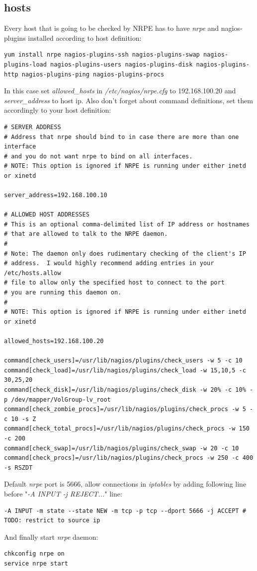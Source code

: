 \documentclass[10pt,a4paper,final]{report}
\begin{document}
\subsection{hosts}
Every host that is going to be checked by NRPE has to have \emph{nrpe} and nagios-plugins installed according to host definition:
\begin{lstlisting}
yum install nrpe nagios-plugins-ssh nagios-plugins-swap nagios-plugins-load nagios-plugins-users nagios-plugins-disk nagios-plugins-http nagios-plugins-ping nagios-plugins-procs
\end{lstlisting}
In this case set \emph{allowed\_hosts} in \emph{/etc/nagios/nrpe.cfg} to 192.168.100.20 and \emph{server\_address} to host ip. Also don't forget about command definitions, set them accordingly to your host definition:
\begin{lstlisting}
# SERVER ADDRESS
# Address that nrpe should bind to in case there are more than one interface
# and you do not want nrpe to bind on all interfaces.
# NOTE: This option is ignored if NRPE is running under either inetd or xinetd

server_address=192.168.100.10

# ALLOWED HOST ADDRESSES
# This is an optional comma-delimited list of IP address or hostnames 
# that are allowed to talk to the NRPE daemon.
#
# Note: The daemon only does rudimentary checking of the client's IP
# address.  I would highly recommend adding entries in your /etc/hosts.allow
# file to allow only the specified host to connect to the port
# you are running this daemon on.
#
# NOTE: This option is ignored if NRPE is running under either inetd or xinetd

allowed_hosts=192.168.100.20

command[check_users]=/usr/lib/nagios/plugins/check_users -w 5 -c 10
command[check_load]=/usr/lib/nagios/plugins/check_load -w 15,10,5 -c 30,25,20
command[check_disk]=/usr/lib/nagios/plugins/check_disk -w 20% -c 10% -p /dev/mapper/VolGroup-lv_root
command[check_zombie_procs]=/usr/lib/nagios/plugins/check_procs -w 5 -c 10 -s Z
command[check_total_procs]=/usr/lib/nagios/plugins/check_procs -w 150 -c 200
command[check_swap]=/usr/lib/nagios/plugins/check_swap -w 20 -c 10
command[check_procs]=/usr/lib/nagios/plugins/check_procs -w 250 -c 400 -s RSZDT
\end{lstlisting}
Default \emph{nrpe} port is 5666, allow connections in \emph{iptables} by adding following line before "\emph{-A INPUT -j REJECT...}" line:
\begin{lstlisting}
-A INPUT -m state --state NEW -m tcp -p tcp --dport 5666 -j ACCEPT # TODO: restrict to source ip
\end{lstlisting}
And finally start \emph{nrpe} daemon:
\begin{lstlisting}
chkconfig nrpe on
service nrpe start
\end{lstlisting}
\end{document}
